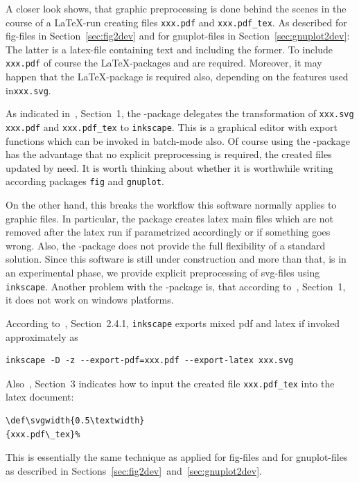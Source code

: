 \documentclass[12pt]{book}
\begin{document}
A closer look shows, that graphic preprocessing is done behind the scenes 
in the course of a \LaTeX-run 
creating files \texttt{xxx.pdf} and \texttt{xxx.pdf\_tex}. 
As described for fig-files in Section~\ref{sec:fig2dev} 
and for gnuplot-files in Section~\ref{sec:gnuplot2dev}: 
The latter is a latex-file containing text 
and including the former. 
To include \texttt{xxx.pdf} 
of course the \LaTeX-packages  and  
are required. 
Moreover, it may happen that the \LaTeX-package  
is required also, depending on the features used in\texttt{xxx.svg}. 

As indicated in~\cite{SvgP}, Section~1, 
the -package delegates the transformation 
of \texttt{xxx.svg} \texttt{xxx.pdf} and \texttt{xxx.pdf\_tex} 
to \texttt{inkscape}. 
This is a graphical editor with export functions 
which can be invoked in batch-mode also. 
Of course using the -package has the advantage 
that no explicit preprocessing is required, 
the created files updated by need. 
It is worth thinking about whether it is worthwhile 
writing according packages \texttt{fig} and \texttt{gnuplot}. 

On the other hand, 
this breaks the workflow this software normally applies to graphic files. 
In particular, the package creates latex main files 
which are not removed after the latex run 
if parametrized accordingly or if something goes wrong. 
Also, the -package does not provide the full flexibility 
of a standard solution. 
Since this software is still under construction 
and more than that, is in an experimental phase, 
we provide explicit preprocessing of svg-files using \texttt{inkscape}. 
Another problem with the -package is, 
that according to~\cite{SvgP}, Section~1, 
it does not work on windows platforms. 


According to~\cite{SvgIncl}, Section~2.4.1, 
\texttt{inkscape} exports mixed pdf and latex if invoked approximately as 
%
\begin{Verbatim}[fontsize=\normalsize]
inkscape -D -z --export-pdf=xxx.pdf --export-latex xxx.svg 
\end{Verbatim} 
%
Also~\cite{SvgIncl}, Section~3 indicates how to input the created file 
\texttt{xxx.pdf\_tex} into the latex document: 
%
\begin{verbatim}
\def\svgwidth{0.5\textwidth}
{xxx.pdf\_tex}%
\end{verbatim}
%
This is essentially the same technique as applied for fig-files 
and for gnuplot-files as described 
in Sections~\ref{sec:fig2dev}~and~\ref{sec:gnuplot2dev}. 
\end{document}
